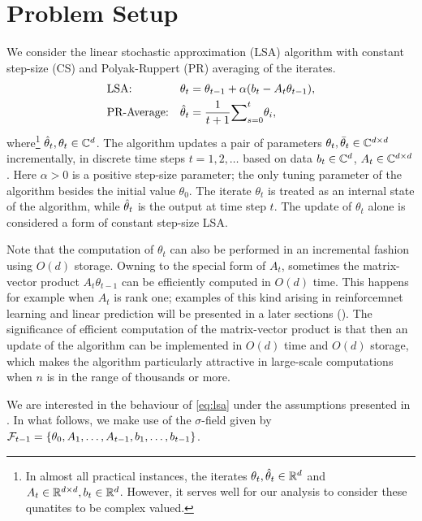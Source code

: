 \section{Problem Setup}
We consider the linear stochastic approximation (LSA) algorithm with constant step-size (CS) and Polyak-Ruppert (PR) averaging of the iterates.
\begin{subequations}\label{eq:lsa}
\begin{align}
\label{conststep}&\text{LSA:} &\theta_t&=\theta_{t-1}+\alpha(b_t-A_t\theta_{t-1}),\\
\label{iteravg}&\text{PR-Average:} &\hat{\theta}_t&=\frac{1}{t+1}{\sum}_{s=0}^{t}\theta_i,
\end{align}
\end{subequations}
where\footnote{In almost all practical instances, the iterates $\theta_t,\hat{\theta}_t\in \mathbb{R}^d$ and $A_t\in \mathbb{R}^{d \times d}, b_t\in \mathbb{R}^d$. However, it serves well for our analysis to consider these qunatites to be complex valued.} $\hat{\theta}_t, \theta_t \in \mathbb{C}^{d}$. The algorithm updates a pair of parameters $\theta_t,\bar{\theta}_t\in \mathbb{C}^{d \times d}$ incrementally, in discrete time steps $t=1,2,\dots$
based on data $b_t\in \mathbb{C}^d$, $A_t\in \mathbb{C}^{d \times d}$. Here $\alpha>0$ is a positive step-size parameter; the only tuning parameter of the algorithm besides the
initial value $\theta_0$. The iterate $\theta_t$ is treated as an internal state of the algorithm, while $\hat{\theta}_t$ is the output at time step $t$. The update of $\theta_t$ alone is considered a form of constant step-size LSA.\par
Note that the computation of $\theta_t$ can also be performed in an incremental fashion using $O(d)$ storage. Owning to the special form of $A_t$, sometimes the matrix-vector product $A_t \theta_{t-1}$ can be efficiently computed in $O(d)$ time. This happens for example when $A_t$ is rank one; examples of this kind arising in reinforcemnet learning \cite{sutton,konda-tsitsiklis,gtd,gtd2,gtdmp} and linear prediction \cite{bach,bachaistats} will be presented in a later sections (). The significance of efficient computation of the matrix-vector product is that then an update of the algorithm
can be implemented in $O(d)$ time and $O(d)$ storage, which makes the algorithm particularly attractive in large-scale computations when $n$ is in the range of thousands or more.\par
We are interested in the behaviour of \eqref{eq:lsa} under the assumptions presented in . In what follows, we make use of the $\sigma$-field given by $\mathcal{F}_{t-1}=\{\theta_0,A_1,\ldots, A_{t-1}, b_1,\ldots, b_{t-1}\}$.
